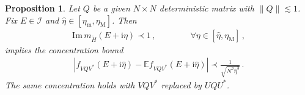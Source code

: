 \documentclass[10pt,reqno]{amsart}
\numberwithin{equation}{section}
\theoremstyle{plain}
\newtheorem{proposition}[theorem]{Proposition}
\numberwithin{kevin}{section}
\theoremstyle{remark}
\renewcommand{\Im}{\mathrm{Im}\,}
\newcommand{\ii}{\mathrm{i}}
\begin{document}
 
\begin{proposition}\label{prop041901}
 Let $Q$ be a given $N\times N$ deterministic matrix with $\|Q\|\lesssim 1$. Fix $E\in \mathcal{I}$ and $\widehat\eta\in[\eta_{\mathrm{m}},\eta_{\mathrm{M}}]$. Then
\begin{eqnarray}
\Im m_{\widetilde H}(E+\ii \eta)\prec 1\,,\qquad \qquad\forall  \eta\in[\widehat{\eta}, \eta_{\mathrm{M}}]\,, \label{041816}
\end{eqnarray} 
implies the concentration bound
\begin{align}
|f_{VQV^*}(E+\ii\widehat{\eta})-\mathbb{E} f_{VQV^*}(E+\ii\widehat{\eta})|\prec \frac{1}{\sqrt{N^2\widehat{\eta}^{3}}}\,. \label{041815}
\end{align}
The same concentration holds with $VQV^*$ replaced by $UQU^*$.
\end{proposition}
\end{document}
